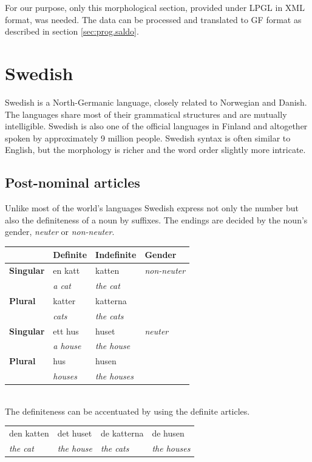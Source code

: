 \documentclass{report}
\begin{document}
For our purpose, only this morphological section, provided under LPGL in XML
format, was needed.
The data can be processed and translated to GF format as described in 
section \ref{sec:prog.saldo}.

\section{Swedish}
\label{sec:swedish}
Swedish \cite[Inl. ]{SAG}is a North-Germanic language,
closely related to Norwegian and Danish. The languages share most of their
grammatical structures and are mutually intelligible. Swedish is also 
one of the official languages in Finland and altogether spoken by approximately 9
million people.
Swedish syntax is often similar to English, but the  morphology is richer and the
word order slightly more intricate.

\subsection*{Post-nominal articles} 
\label{sec:swedishnoun}
Unlike most of the world's languages Swedish express not only the number but also
the definiteness of a noun by suffixes. The endings are decided by the noun's gender,
\textit{neuter} or \textit{non-neuter}.\\
\begin{tabular}{l|lll}
&\textbf{Definite}& \textbf{Indefinite}& \textbf{Gender} \\
 \hline
\textbf{Singular} & {en katt} & {katten} & \textit{non-neuter}\\
& \emph{a cat} & \emph{the cat} &\\
\textbf{Plural} & katter & katterna &\\
 &\emph{cats} & \emph{the cats} &\\
 \hline
\textbf{Singular} & {ett hus} & {huset} & \textit{neuter}\\
 & \emph{a house} & \emph{the house} & \\
\textbf{Plural} & hus & husen & \\
& \emph{houses} & \emph{the houses} & \\
\end{tabular}\\

The definiteness can be accentuated by using the definite articles.\\
\begin{tabular}{llll}
den katten & det huset & de katterna & de husen \\
\emph{the cat} & \emph{the house} & \emph{the cats} & \emph{the houses} \\
\end{tabular}\\
\end{document}
